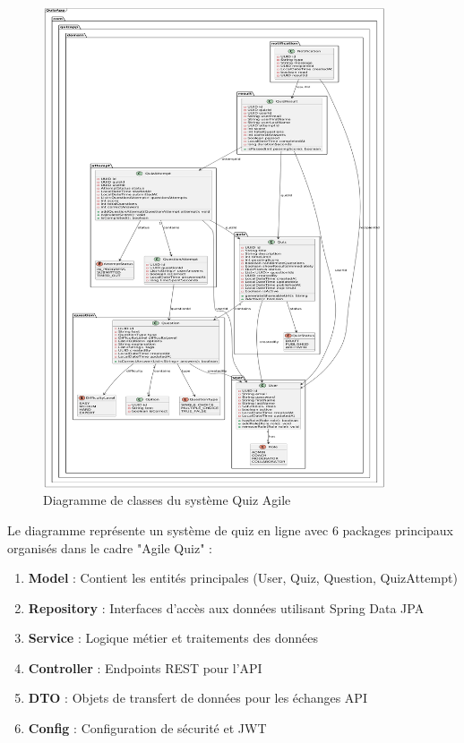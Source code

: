 \documentclass[12pt,a4paper]{report}
\begin{document}
\begin{figure}[H]
\centering
\includegraphics[width=0.9\textwidth]{latex_media/media/image16.png}
\caption{Diagramme de classes du système Quiz Agile}
\label{fig:diagramme-classes}
\end{figure}

Le diagramme représente un système de quiz en ligne avec 6 packages principaux organisés dans le cadre "Agile Quiz" :

\begin{enumerate}
\item \textbf{Model} : Contient les entités principales (User, Quiz, Question, QuizAttempt)
\item \textbf{Repository} : Interfaces d'accès aux données utilisant Spring Data JPA
\item \textbf{Service} : Logique métier et traitements des données
\item \textbf{Controller} : Endpoints REST pour l'API
\item \textbf{DTO} : Objets de transfert de données pour les échanges API
\item \textbf{Config} : Configuration de sécurité et JWT
\end{enumerate}
\end{document}
